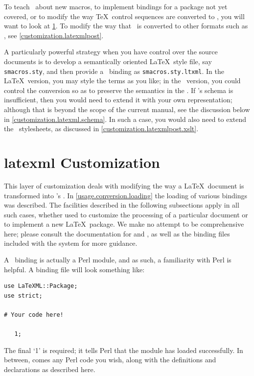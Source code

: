 \documentclass{book}
\begin{document}
To teach \LaTeXML\ about new macros, to implement bindings for a
package not yet covered, or to modify the way \TeX\ control sequences
are converted to \XML, you will want to look at \ref{customization.latexml}.
To modify the way that \XML\ is converted to other formats such as \HTML,
see \ref{customization.latexmlpost}.

A particularly powerful strategy when you have control over the
source documents is to develop a semantically oriented \LaTeX\ style file,
say \texttt{smacros.sty}, and then provide a \LaTeXML\ binding
as \texttt{smacros.sty.ltxml}. In the \LaTeX\ version, you may style
the terms as you like; in the \LaTeXML\ version, you could control
the conversion so as to preserve the semantics in the \XML.
If \LaTeXML's schema is insufficient, then you would need to extend it
with your own representation; although that is beyond the scope of
the current manual, see the discussion below in \ref{customization.latexml.schema}.
In such a case, you would also need to extend the \XSLT\ stylesheets,
as discussed in \ref{customization.latexmlpost.xslt}.

\section{latexml Customization}\label{customization.latexml}
This layer of customization deals with modifying the way a \LaTeX\ document
is transformed into \LaTeXML's \XML.
In \ref{usage.conversion.loading} the loading of various bindings was
described.  The facilities described in the following subsections
apply in all such cases, whether used to customize the processing
of a particular document or to implement a new \LaTeX\ package.
We make no attempt to be comprehensive here; please consult
the documentation for  and ,
as well as the binding files included with the system
for more guidance.

A \LaTeXML\ binding is actually a Perl module, and as such, 
a familiarity with Perl is helpful.
A binding file will look something like:
\begin{lstlisting}[style=latexml]
use LaTeXML::Package;
use strict;

# Your code here!

   1;
\end{lstlisting}
The final `1' is required; it tells Perl that the module has loaded successfully.
In between, comes any Perl code you wish, along with the definitions
and declarations as described here.
\end{document}
